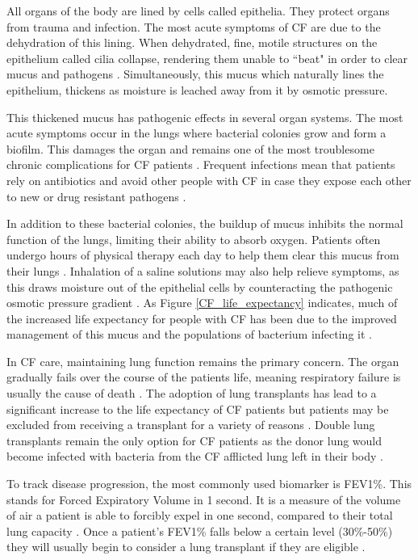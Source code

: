 All organs of the body are lined by cells called epithelia. They protect organs from trauma and infection. The most acute symptoms of CF are due to the dehydration of this lining. When dehydrated, fine, motile structures on the epithelium called cilia collapse, rendering them unable to ``beat" in order to clear mucus and pathogens \cite{boucher2007, szczesniak2017}. Simultaneously, this mucus which naturally lines the epithelium, thickens as moisture is leached away from it by osmotic pressure.

This thickened mucus has pathogenic effects in several organ systems. The most acute symptoms occur in the lungs where bacterial colonies grow and form a biofilm. This damages the organ and remains one of the most troublesome chronic complications for CF patients \cite{chiappini2014, krouse2001}. Frequent infections mean that patients rely on antibiotics and avoid other people with CF in case they expose each other to new or drug resistant pathogens \cite{conway2008, baldoni2019}. 

In addition to these bacterial colonies, the buildup of mucus inhibits the normal function of the lungs, limiting their ability to absorb oxygen. Patients often undergo hours of physical therapy each day to help them clear this mucus from their lungs \cite{chest_pt_CFF,thefreylife2015}. Inhalation of a saline solutions may also help relieve symptoms, as this draws moisture out of the epithelial cells by counteracting the pathogenic osmotic pressure gradient \cite{wark2018}. As Figure \ref{CF_life_expectancy} indicates, much of the increased life expectancy for people with CF has been due to the improved management of this mucus and the populations of bacterium infecting it \cite{mcbennett2022}. 

In CF care, maintaining lung function remains the primary concern. The organ gradually fails over the course of the patients life, meaning respiratory failure is usually the cause of death \cite{kumar2018}. The adoption of lung transplants has lead to a significant increase to the life expectancy of CF patients but patients may be excluded from receiving a transplant for a variety of reasons \cite{blatter2015, weill2018}. Double lung transplants remain the only option for CF patients as the donor lung would become infected with bacteria from the CF afflicted lung left in their body \cite{mcbennett2022}. 

To track disease progression, the most commonly used biomarker is FEV1\%. This stands for Forced Expiratory Volume in 1 second. It is a measure of the volume of air a patient is able to forcibly expel in one second, compared to their total lung capacity \cite{szczesniak2017}. Once a patient's FEV1\% falls below a certain level (30\%-50\%) they will usually begin to consider a lung transplant if they are eligible \cite{adler2009}.

